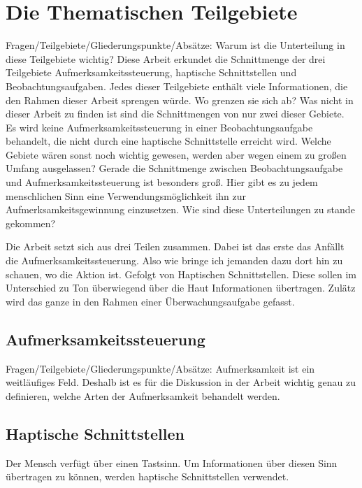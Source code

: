 \documentclass{llncs}					%
\begin{document}
\section{Die Thematischen Teilgebiete}
Fragen/Teilgebiete/Gliederungspunkte/Absätze:
Warum ist die Unterteilung in diese Teilgebiete wichtig?
Diese Arbeit erkundet die Schnittmenge der drei Teilgebiete Aufmerksamkeitssteuerung, haptische Schnittstellen und Beobachtungsaufgaben. Jedes dieser Teilgebiete enthält viele Informationen, die den Rahmen dieser Arbeit sprengen würde.
Wo grenzen sie sich ab?
Was nicht in dieser Arbeit zu finden ist sind die Schnittmengen von nur zwei dieser Gebiete. Es wird keine Aufmerksamkeitssteuerung in einer Beobachtungsaufgabe behandelt, die nicht durch eine haptische Schnittstelle erreicht wird.
Welche Gebiete wären sonst noch wichtig gewesen, werden aber wegen einem zu großen Umfang ausgelassen?
Gerade die Schnittmenge zwischen Beobachtungsaufgabe und Aufmerksamkeitssteuerung ist besonders groß. Hier gibt es zu jedem menschlichen Sinn eine Verwendungsmöglichkeit ihn zur Aufmerksamkeitsgewinnung einzusetzen.
Wie sind diese Unterteilungen zu stande gekommen?

Die Arbeit setzt sich aus drei Teilen zusammen. Dabei ist das erste das Anfällt die Aufmerksamkeitssteuerung. Also wie bringe ich jemanden dazu dort hin zu schauen, wo die Aktion ist. Gefolgt von Haptischen Schnittstellen. Diese sollen im Unterschied zu Ton überwiegend über die Haut Informationen übertragen. Zulätz wird das ganze in den Rahmen einer Überwachungsaufgabe gefasst.

\subsection{Aufmerksamkeitssteuerung}
Fragen/Teilgebiete/Gliederungspunkte/Absätze:
Aufmerksamkeit ist ein weitläufiges Feld. Deshalb ist es für die Diskussion in der Arbeit wichtig genau zu definieren, welche Arten der Aufmerksamkeit behandelt werden.

\subsection{Haptische Schnittstellen}
Der Mensch verfügt über einen Tastsinn. Um Informationen über diesen Sinn übertragen zu können, werden haptische Schnittstellen verwendet. 

 
\end{document}
